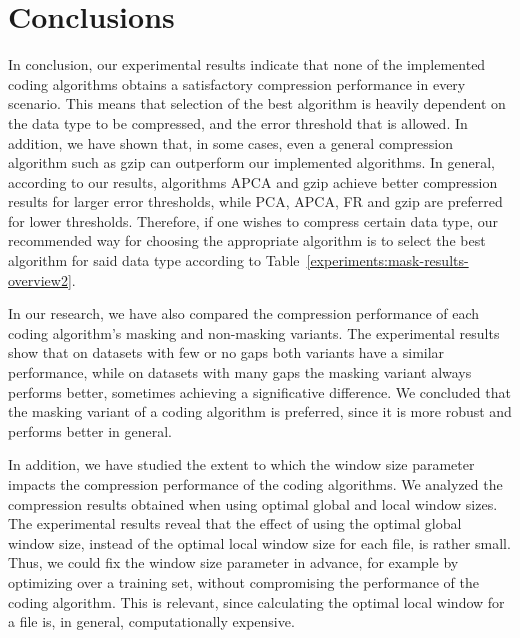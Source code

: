 
\section{Conclusions}
\label{secX:conclu}


In conclusion, our experimental results indicate that none of the implemented coding algorithms obtains a satisfactory compression performance in every scenario. This means that selection of the best algorithm is heavily dependent on the data type to be compressed, and the error threshold that is allowed. In addition, we have shown that, in some cases, even a general compression algorithm such as gzip can outperform our implemented algorithms. In general, according to our results, algorithms APCA and gzip achieve better compression results for larger error thresholds, while PCA, APCA, FR and gzip are preferred for lower thresholds. Therefore, if one wishes to compress certain data type, our recommended way for choosing the appropriate algorithm is to select the best algorithm for said data type according to Table~\ref{experiments:mask-results-overview2}.


In our research, we have also compared the compression performance of each coding algorithm's masking and non-masking variants. The experimental results show that on datasets with few or no gaps both variants have a similar performance, while on datasets with many gaps the masking variant always performs better, sometimes achieving a significative difference. We concluded that the masking variant of a coding algorithm is preferred, since it is more robust and performs better in general.


In addition, we have studied the extent to which the window size parameter impacts the compression performance of the coding algorithms. We analyzed the compression results obtained when using optimal global and local window sizes. The experimental results reveal that the effect of using the optimal global window size, instead of the optimal local window size for each file, is rather small. Thus, we could fix the window size parameter in advance, for example by optimizing over a training set, without compromising the performance of the coding algorithm. This is relevant, since calculating the optimal local window for a file is, in general, computationally expensive.